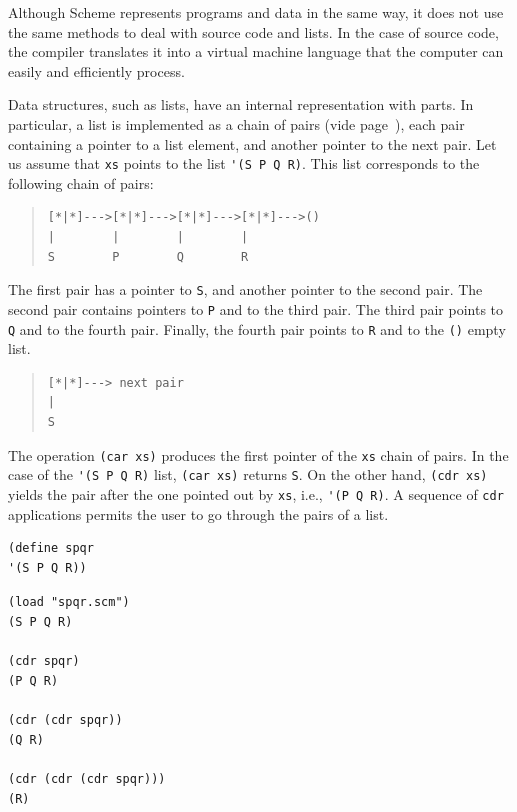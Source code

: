 \documentclass[a4paper,12pt]{book}
\newenvironment{fmpage}[1]
           {\begin{lrbox}{\fmbox}\begin{minipage}{#1}}
           {\end{minipage}\end{lrbox}\fbox{\usebox{\fmbox}}}
\begin{document}
Although Scheme represents programs and
data in the same way, it does not use
the same methods to deal with source
code and lists. In the case of source
code, the compiler translates it into
a virtual machine language that the
computer can easily and efficiently
process.

Data structures, such as lists, have
an internal representation with parts. 
In particular, a list is implemented
as a chain of pairs 
(vide page~\pageref{page:cartesian-pair}),
each pair containing
a pointer to a list element,
and another pointer to the next pair. 
Let us assume that
\verb|xs| points to the list
\verb|'(S P Q R)|.
This list corresponds to the following
chain of pairs:
\begin{quote}
\begin{verbatim}
[*|*]--->[*|*]--->[*|*]--->[*|*]--->()
|        |        |        |        
S        P        Q        R       
\end{verbatim}
\end{quote}
The first pair has a pointer to \verb|S|,
and another pointer to the second pair.
The second pair contains pointers to 
\verb|P| and to the third pair. 
The third pair points to \verb|Q| and
to the fourth pair. Finally, the fourth
pair points to \verb|R| and to 
the \verb|()| empty list.

\begin{quote}
\begin{verbatim}
[*|*]---> next pair
|        
S      
\end{verbatim}
\end{quote}
The operation \verb|(car xs)| produces
the first pointer of the \verb|xs| 
chain of pairs. In the case of
the \verb|'(S P Q R)| list, \verb|(car xs)|
returns \verb|S|. On the other hand,
\verb|(cdr xs)| yields the pair
after the one pointed out by \verb|xs|,
i.e., \verb|'(P Q R)|. A sequence
of \verb|cdr| applications permits the user to
go through the pairs of a list. \\

\begin{fmpage}{0.8\linewidth}
\begin{verbatim}
(define spqr
'(S P Q R))
\end{verbatim}
\end{fmpage}

\begin{fmpage}{0.8\linewidth}
\verb|(load "spqr.scm")|\keys{~]~}\\
\verb|(S P Q R)|\\
\verb||\\
\verb|(cdr spqr)|\\
\verb|(P Q R)|\\
\verb||\\
\verb|(cdr (cdr spqr))|\\
\verb|(Q R)|\\
\verb||\\
\verb|(cdr (cdr (cdr spqr)))|\\
\verb|(R)|
\end{fmpage}
\end{document}
